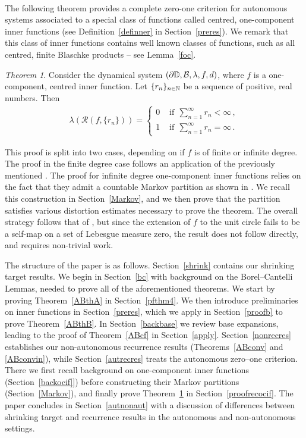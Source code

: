 \documentclass[11pt,reqno]{amsart}
\newcommand{\N}{{\Bbb N}}
\newcommand{\D}{{\Bbb D}}
\newcommand{\0}{\mathbf{0}}
\newtheorem{TAA}{Theorem}
\theoremstyle{remark}
\numberwithin{equation}{section}
\newtheorem{TAA}{Theorem}
\theoremstyle{remark}
\numberwithin{equation}{section}
\newcommand{\cR}{\mathcal{R}}
\begin{document}
\\
The following theorem provides a complete zero-one criterion for autonomous systems associated to a special class of functions called centred, one-component inner functions (see Definition~\ref{definner} in Section~\ref{preres}). We remark that this class of inner functions contains well known classes of functions, such as all centred, finite Blaschke products -- see Lemma~\ref{foc}.

\begin{TAA}\label{ABrecocif}
   Consider the dynamical system $(\partial \D, \mathcal{B},\lambda,f,d)$, where $f$ is a one-component, centred inner function. Let $\{r_n\}_{n \in \N}$ be a sequence of positive, real numbers. Then 
   \begin{eqnarray*}
   \lambda(\cR(f,\{r_n\}) )= \begin{cases}
        0 &\text{ \ if}\ \  \sum\limits_{n=1}^\infty r_n <\infty \,  ,\\[3ex]
        1 &\text{ \ if}\ \  \sum\limits_{n=1}^\infty r_n
        =\infty \, .
    \end{cases}
	\end{eqnarray*}
\end{TAA}
This proof is split into two cases, depending on if $f$ is of finite or infinite degree. The proof in the finite degree case follows an application of the previously mentioned \cite[Theorem~1.3]{HeLi}. 
The proof for infinite degree one-component inner functions relies on the fact that they admit a countable Markov partition as shown in \cite{urb}. We recall this construction in Section~\ref{Markov}, and we then prove that the partition satisfies various distortion estimates necessary to prove the theorem. The overall strategy follows that of \cite[Theorem~1.3]{HLSW}, but since the extension of $f$ to the unit circle fails to be a self-map on a set of Lebesgue measure zero, the result does not follow directly, and requires non-trivial work. 


\medskip
The structure of the paper is as follows. Section~\ref{shrink} contains our shrinking target results. We begin in Section~\ref{bc} with background on the Borel–Cantelli Lemmas, needed to prove all of the aforementioned theorems. We start by proving Theorem~\ref{ABthA} in Section~\ref{pfthm4}. We then introduce preliminaries on inner functions in Section~\ref{preres}, which we apply in Section~\ref{proofb} to prove Theorem~\ref{ABthB}. In Section~\ref{backbase} we review base expansions, leading to the proof of Theorem~\ref{ABcf} in Section~\ref{apply}.
Section~\ref{nonrecres} establishes our non-autonomous recurrence results (Theorems~\ref{ABconv} and \ref{ABconvin}), while Section~\ref{autrecres} treats the autonomous zero–one criterion. There we first recall background on one-component inner functions (Section~\ref{backocif]}) before constructing their Markov partitions (Section~\ref{Markov}), and finally prove Theorem~\ref{ABrecocif} in Section~\ref{proofrecocif}. The paper concludes in Section~\ref{autnonaut} with a discussion of differences between shrinking target and recurrence results in the autonomous and non-autonomous settings.
\end{document}
